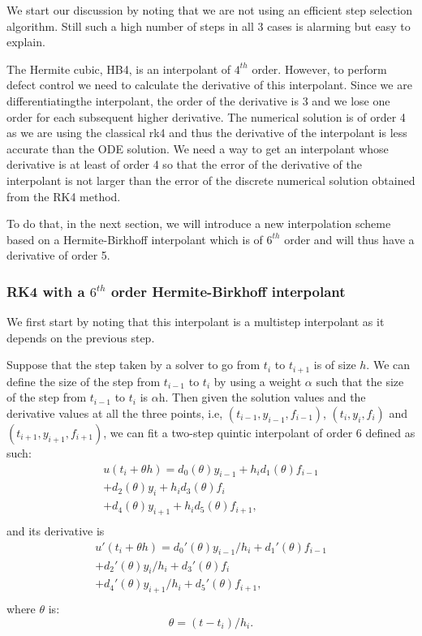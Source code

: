 \documentclass{article}
\begin{document}
We start our discussion by noting that we are not using an efficient step selection algorithm. Still such a high number of steps in all 3 cases is alarming but easy to explain.

The Hermite cubic, HB4, is an interpolant of $4^{th}$ order. However, to perform defect control we need to calculate the derivative of this interpolant. Since we are differentiatingthe interpolant, the order of the derivative is 3 and we lose one order for each subsequent higher derivative. The numerical solution is of order 4 as we are using the classical rk4 and thus the derivative of the interpolant is less accurate than the ODE solution. We need a way to get an interpolant whose derivative is at least of order 4 so that the error of the derivative of the interpolant is not larger than the error of the discrete numerical solution obtained from the RK4 method.

To do that, in the next section, we will introduce a new interpolation scheme based on a Hermite-Birkhoff interpolant which is of $6^{th}$ order and will thus have a derivative of order 5.

\subsubsection{RK4 with a $6^{th}$ order Hermite-Birkhoff interpolant}
We first start by noting that this interpolant is a multistep interpolant as it depends on the previous step.

Suppose that the step taken by a solver to go from $t_i$ to $t_{i + 1}$ is of size $h$. We can define the size of the step from $t_{i - 1}$ to $t_i$ by using a weight $\alpha$ such that the size of the step from $t_{i - 1}$ to $t_i$ is $\alpha$h. Then given the solution values and the derivative values at all the three points, i.e, $(t_{i-1}, y_{i - 1}, f_{i - 1})$, $(t_i, y_i, f_i)$ and $(t_{i + 1}, y_{i + 1}, f_{i + 1})$, we can fit a two-step quintic interpolant of order 6 defined as such:
\begin{equation}
\begin{split}
u(t_i + \theta h) = d_{0}(\theta) y_{i-1} +  h_id_{1}(\theta)f_{i-1} \\
+ d_{2}(\theta)y_i     +  h_id_{3}(\theta)f_i \\
+ d_{4}(\theta)y_{i + 1} + h_id_{5}(\theta)f_{i + 1}, \\
\end{split}
\end{equation}
and its derivative is
\begin{equation}
\begin{split}
u'(t_i + \theta h) = d_{0}'(\theta)y_{i-1}/h_i +  d_{1}'(\theta)f_{i-1} \\
+ d_{2}'(\theta)y_i/h_i     +  d_{3}'(\theta)f_i \\
+ d_{4}'(\theta)y_{i + 1}/h_i + d_{5}'(\theta)f_{i + 1}, \\
\end{split}
\end{equation}
where $\theta$ is:
\begin{equation}
\theta = (t - t_i) / h_i.
\end{equation}
\end{document}
